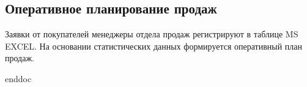 \newpage
\subsection{Оперативное планирование продаж}
\label{bp:salesplan}

Заявки от покупателей менеджеры отдела продаж регистрируют в таблице MS EXCEL. На основании статистических данных  формируется оперативный план продаж.



\clearpage
 {enddoc}